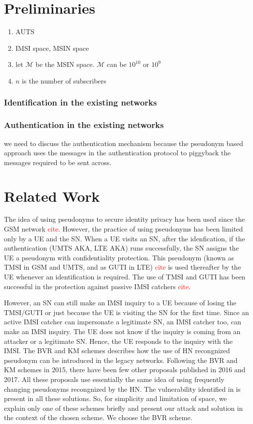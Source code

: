 \documentclass{llncs} %
\begin{document}
\section{Preliminaries}

\begin{enumerate}
 \item AUTS
 \item IMSI space, MSIN space
 \item let $\mathcal{M}$ be the MSIN space. $\mathcal{M}$ can be $10^10$ or $10^9$
 \item $n$ is the number of subscribers
\end{enumerate}


\subsubsection{Identification in the existing networks}
\subsubsection{Authentication in the existing networks} we need to discuss the authentication mechanism because the pseudonym based approach uses the messages in the authentication protocol to piggyback the messages required to be sent across.

\section{Related Work}
The idea of using pseudonyms to secure identity privacy has been used since the GSM network \textcolor{red}{cite}. However, the practice of using pseudonyms has been limited only by a UE and the SN. When a UE visits an SN, after the idenfication, if the authentication (UMTS AKA, LTE AKA) runs successfully, the SN assigns the UE a pseudonym with confidentiality protection. This pseudonym (known as TMSI in GSM and UMTS, and as GUTI in LTE) \textcolor{red}{cite} is used thereafter by the UE whenever an identification is required. The use of TMSI and GUTI has been successful in the protection against passive IMSI catchers \textcolor{red}{cite}.

However, an SN can still make an IMSI inquiry to a UE because of losing the TMSI/GUTI or just because the UE is visiting the SN for the first time.  Since an active IMSI catcher can impersonate a legitimate SN, an IMSI catcher too, can make an IMSI inquiry. The UE does not know if the inquiry is coming from an attacker or a legitimate SN. Hence, the UE responds to the inquiry with the IMSI. The BVR and KM schemes describes how the use of HN recongnized pseudonym can be introduced in the legacy networks. Following the BVR and KM schemes in 2015, there have been few other proposals \cite{Ginzboorg_Niemi_2016,Norrman_Naslund_Dubrova_2016,yemen2017} published in 2016 and 2017. All these proposals use essentially the same idea of using frequently changing pseudonyms recongnized by the HN. The vulnerability identified in \cite{wisec17} is present in all these solutions. So, for simplicity and limitation of space, we explain only one of these schemes briefly and present our attack and solution in the context of the chosen scheme. We choose the BVR scheme.
\end{document}
